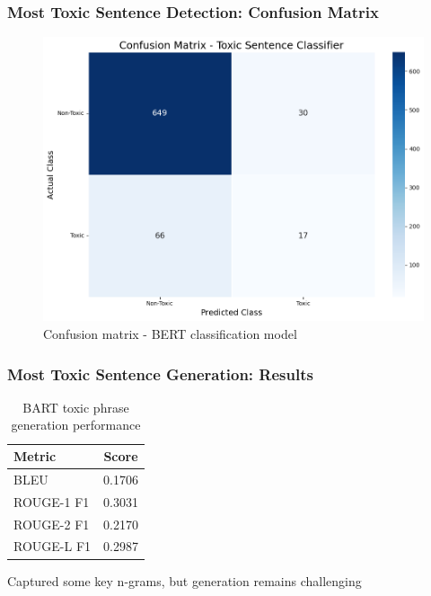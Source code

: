 \documentclass{beamer}
\begin{document}
\begin{frame}
\frametitle{Most Toxic Sentence Detection: Confusion Matrix}

\begin{figure}
\centering
\includegraphics[width=0.7\linewidth]{figures/bert_toxic_confusion_matrix.png}
\caption{Confusion matrix - BERT classification model}
\end{figure}

\end{frame}

\begin{frame}
\frametitle{Most Toxic Sentence Generation: Results}

\begin{table}
\centering
\footnotesize
\begin{tabular}{lc}
\toprule
Metric & Score \\
\midrule
BLEU & 0.1706 \\
ROUGE-1 F1 & 0.3031 \\
ROUGE-2 F1 & 0.2170 \\
ROUGE-L F1 & 0.2987 \\
\bottomrule
\end{tabular}
\caption{BART toxic phrase generation performance}
\end{table}

\vspace{0.2cm}
\begin{center}
\colorbox{green!10}{\parbox{0.8\linewidth}{\centering Captured some key n-grams, but generation remains challenging}}
\end{center}

\end{frame}
\end{document}
